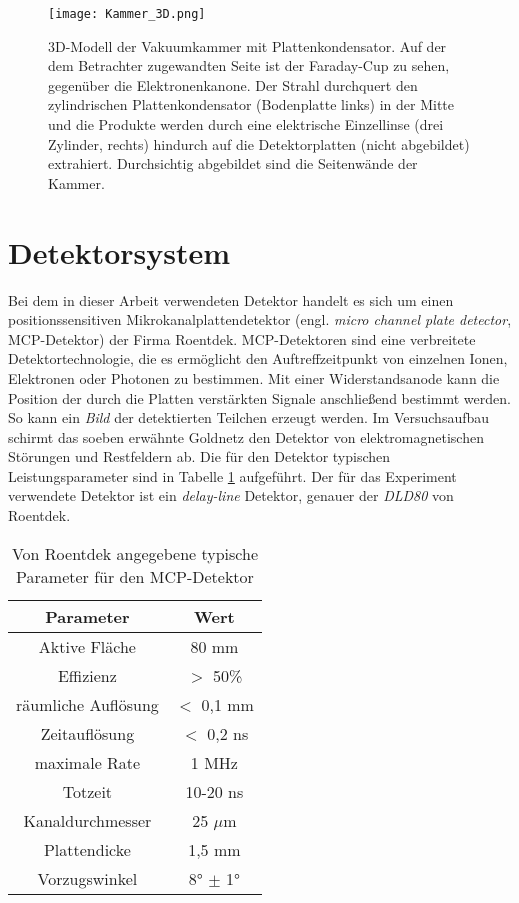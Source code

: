 \begin{figure}
    \centering
    \hspace{-2.8cm}\texttt{[image: Kammer\_3D.png]}
    \caption[3D-Modell der Vakuumkammer mit Plattenkondensator]{3D-Modell der Vakuumkammer mit Plattenkondensator. Auf der dem Betrachter zugewandten Seite ist der Faraday-Cup zu sehen, gegenüber die Elektronenkanone. Der Strahl durchquert den zylindrischen Plattenkondensator (Bodenplatte links) in der Mitte und die Produkte werden durch eine elektrische Einzellinse (drei Zylinder, rechts) hindurch auf die Detektorplatten (nicht abgebildet) extrahiert. Durchsichtig abgebildet sind die Seitenwände der Kammer.}
    \label{fig:3D}
\end{figure}

\section{Detektorsystem}
Bei dem in dieser Arbeit verwendeten Detektor handelt es sich um einen positionssensitiven Mikrokanalplattendetektor (engl. \textit{micro channel plate detector}, MCP-Detektor) der Firma Roentdek. MCP-Detektoren sind eine verbreitete Detektortechnologie, die es ermöglicht den Auftreffzeitpunkt von einzelnen Ionen, Elektronen oder Photonen zu bestimmen. Mit einer Widerstandsanode kann die Position der durch die Platten verstärkten Signale anschließend bestimmt werden. So kann ein \textit{Bild} der detektierten Teilchen erzeugt werden. Im Versuchsaufbau schirmt das soeben erwähnte Goldnetz den Detektor von elektromagnetischen Störungen und Restfeldern ab. Die für den Detektor typischen Leistungsparameter sind in Tabelle \ref{tab:MCP} aufgeführt. Der für das Experiment verwendete Detektor ist ein \textit{delay-line} Detektor, genauer der \textit{DLD80} von Roentdek.

\begin{table}[h]
    \centering
    \caption{Von Roentdek angegebene typische Parameter für den MCP-Detektor}
    \begin{tabular}{c|c}
        Parameter & Wert \\
        \hline
        Aktive Fläche & 80 mm \\
        Effizienz & $>$ 50\% \\
        räumliche Auflösung & $<$ 0,1 mm \\
        Zeitauflösung & $<$ 0,2 ns \\
        maximale Rate & 1 MHz \\
        Totzeit & 10-20 ns \\
        Kanaldurchmesser & 25 $\mu$m \\
        Plattendicke & 1,5 mm \\
        Vorzugswinkel & \ang{8} $\pm$ \ang{1} \\

    \end{tabular}
    \label{tab:MCP}
\end{table}

